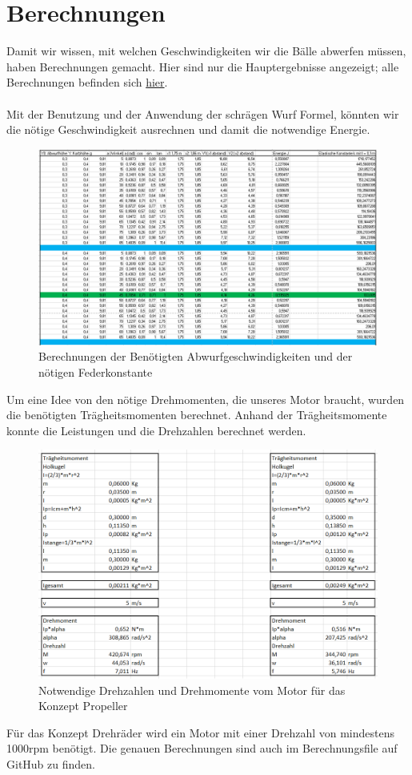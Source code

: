 \section{Berechnungen}
Damit wir wissen, mit welchen Geschwindigkeiten wir die Bälle abwerfen müssen, haben Berechnungen gemacht.
Hier sind nur die Hauptergebnisse angezeigt; alle Berechnungen befinden sich \href{https://github.com/accefa/doku/tree/master/bin/Berechnungen.xlsx}{hier}. \\ \\
Mit der Benutzung und der Anwendung der schrägen Wurf Formel, könnten wir die nötige Geschwindigkeit ausrechnen und damit die notwendige Energie.
\begin{figure}[h!]
	\centering
	\includegraphics[width=1\textwidth]{../../fig/Geschwindigkeit_und_eleastische_Konstante.png}
	\caption{Berechnungen der Benötigten Abwurfgeschwindigkeiten und der nötigen Federkonstante}
	\label{fig:Berechnungen von die Geschwindigkeit}
\end{figure}
\newpage
Um eine Idee von den nötige Drehmomenten, die unseres Motor braucht, wurden die benötigten Trägheitsmomenten berechnet. Anhand der Trägheitsmomente konnte die Leistungen und die Drehzahlen berechnet werden.
\begin{figure}[h!]
	\centering
	\includegraphics[width=1\textwidth]{../../fig/Berechnungen_Propeller.png}
	\caption{Notwendige Drehzahlen und Drehmomente vom Motor für das Konzept Propeller}
	\label{fig:Berechnungen für der Propellerkonzept}
\end{figure}

Für das Konzept Drehräder wird ein Motor mit einer Drehzahl von mindestens 1000rpm benötigt. Die genauen Berechnungen sind auch im Berechnungsfile auf GitHub zu finden. 
